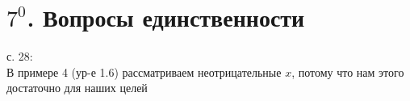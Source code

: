 \section{\texorpdfstring{$ 7^0 $}{7}. Вопросы единственности}

с. 28: \\
В примере 4 (ур-е 1.6) рассматриваем неотрицательные $ x $, потому что нам этого достаточно для наших целей
